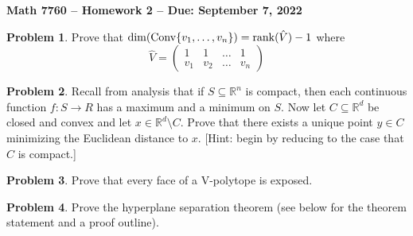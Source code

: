 \documentclass[letterpaper,11pt]{amsart}
\theoremstyle{plain}
\theoremstyle{definition}
\newtheorem{pr}{Problem}
\theoremstyle{remark}
\newcommand{\conv}{{\rm Conv}}
\newcommand{\rank}{{\rm rank}}
\begin{document}
\Large

\begin{center}
{\bf Math 7760 -- Homework  2 --  Due:  September 7, 2022}
\end{center}

\normalsize


\bigskip


\bigskip

\begin{pr}
    Prove that $\dim(\conv\{v_1,\dots,v_n\}) = \rank(\hat{V}) - 1$ where
    \[
        \hat{V} = \begin{pmatrix}
            1 & 1 & \dots & 1 \\
            v_1 & v_2 & \dots & v_n
        \end{pmatrix}
    \]
\end{pr}

\begin{pr}\label{convexNearest}
    Recall from analysis that if $S \subseteq \mathbb{R}^n$ is compact, then each continuous function $f: S \rightarrow R$
    has a maximum and a minimum on $S$.
    Now let $C\subseteq \mathbb{R}^d$ be closed and convex and let $x \in \mathbb{R}^d \setminus C$.
    Prove that there exists a unique point $y \in C$ minimizing the Euclidean distance to $x$.
    [Hint: begin by reducing to the case that $C$ is compact.]
\end{pr}

\begin{pr}
    Prove that every face of a V-polytope is exposed.
\end{pr}

\bigskip


\bigskip

\begin{pr}
    Prove the hyperplane separation theorem (see below for the theorem statement and a proof outline).
\end{pr}
\end{document}
